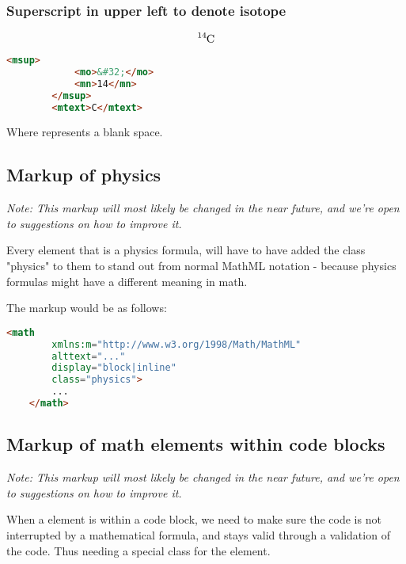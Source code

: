 \documentclass[english,a4paper,11pt]{article}
\begin{document}
\subsubsection{Superscript in upper left to denote isotope}\label{chemistry-isotope}

\begin{eksempler}
	\begin{equation}
		\ce{^{14}C}
	\end{equation}
	\begin{lstlisting}[language=HTML]
		<msup>
			<mo>&#32;</mo>
			<mn>14</mn>
		</msup>
		<mtext>C</mtext>
	\end{lstlisting}
	Where  represents a blank space.
\end{eksempler}

\subsection{Markup of physics}\label{physics}

\textit{Note: This markup will most likely be changed in the near future, and we're open to suggestions on how to improve it.}

Every  element that is a physics formula, will have to have added the class "physics" to them to stand out from normal MathML notation - because physics formulas might have a different meaning in math.

\begin{eksempler}
The markup would be as follows:
\begin{lstlisting}[language=HTML]
	<math 
	    xmlns:m="http://www.w3.org/1998/Math/MathML"
	    alttext="..."
	    display="block|inline"
		class="physics">
		...
	</math>
\end{lstlisting}
\end{eksempler}

\subsection{Markup of math elements within code blocks}

\textit{Note: This markup will most likely be changed in the near future, and we're open to suggestions on how to improve it.}

When a  element is within a code block, we need to make sure the code is not interrupted by a mathematical formula, and stays valid through a validation of the code. Thus needing a special class for the  element.
\end{document}
